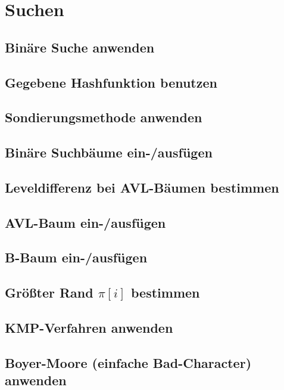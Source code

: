 \chapter{Suchen}

\section{Binäre Suche anwenden}

\section{Gegebene Hashfunktion benutzen}

\section{Sondierungsmethode anwenden}

\section{Binäre Suchbäume ein-/ausfügen}

\section{Leveldifferenz bei AVL-Bäumen bestimmen}

\section{AVL-Baum ein-/ausfügen}

\section{B-Baum ein-/ausfügen}

\section{Größter Rand $\pi[i]$ bestimmen}

\section{KMP-Verfahren anwenden}

\section{Boyer-Moore (einfache Bad-Character) anwenden}

